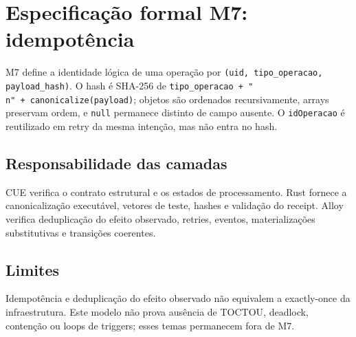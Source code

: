 \clearpage
\section{Especificação formal M7: idempotência}
\label{sec:formal-m7}

M7 define a identidade lógica de uma operação por
\texttt{(uid, tipo\_operacao, payload\_hash)}. O hash é SHA-256 de
\texttt{tipo\_operacao + "\\n" + canonicalize(payload)}; objetos são ordenados
recursivamente, arrays preservam ordem, e \texttt{null} permanece distinto de
campo ausente. O \texttt{idOperacao} é reutilizado em retry da mesma intenção,
mas não entra no hash.

\subsection*{Responsabilidade das camadas}
CUE verifica o contrato estrutural e os estados de processamento. Rust fornece
a canonicalização executável, vetores de teste, hashes e validação do receipt.
Alloy verifica deduplicação do efeito observado, retries, eventos,
materializações substitutivas e transições coerentes.

\begingroup\small\raggedright


\par\endgroup

\subsection*{Limites}
Idempotência e deduplicação do efeito observado não equivalem a exactly-once da
infraestrutura. Este modelo não prova ausência de TOCTOU, deadlock, contenção ou
loops de triggers; esses temas permanecem fora de M7.
